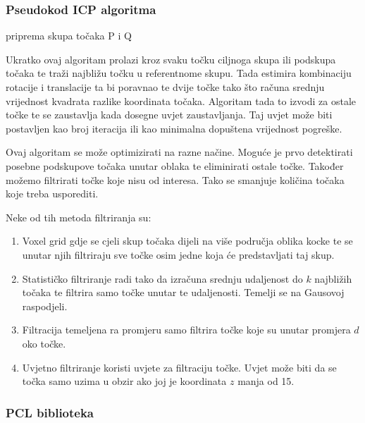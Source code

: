 \subsubsection{Pseudokod ICP algoritma}

\begin{algorithm}[h!]
\SetAlgoLined
{}
 priprema skupa točaka P i Q\;
\end{algorithm}

Ukratko ovaj algoritam prolazi kroz svaku točku ciljnoga skupa ili podskupa točaka te traži najbližu točku u referentnome skupu. Tada estimira kombinaciju rotacije i translacije ta bi poravnao te dvije točke tako što računa srednju vrijednost kvadrata razlike koordinata točaka. Algoritam tada to izvodi za ostale točke te se zaustavlja kada dosegne uvjet zaustavljanja. Taj uvjet može biti postavljen kao broj iteracija ili kao minimalna dopuštena vrijednost pogreške.

Ovaj algoritam se može optimizirati na razne načine. Moguće je prvo detektirati posebne podskupove točaka unutar oblaka te eliminirati ostale točke. Također možemo filtrirati točke koje nisu od interesa. Tako se smanjuje količina točaka koje treba usporediti.

Neke od tih metoda filtriranja su:
\begin{enumerate}
  \item Voxel grid gdje se cjeli skup točaka dijeli na više područja oblika kocke te se unutar njih filtriraju sve točke osim jedne koja će predstavljati taj skup.
  \item Statističko filtriranje radi tako da izračuna srednju udaljenost do $k$ najbližih točaka te filtrira samo točke unutar te udaljenosti. Temelji se na Gausovoj raspodjeli.
  \item Filtracija temeljena ra promjeru samo filtrira točke koje su unutar promjera $d$ oko točke.
  \item Uvjetno filtriranje koristi uvjete za filtraciju točke. Uvjet može biti da se točka samo uzima u obzir ako joj je koordinata $z$ manja od 15.
\end{enumerate}

\pagebreak
\subsubsection{PCL biblioteka}

